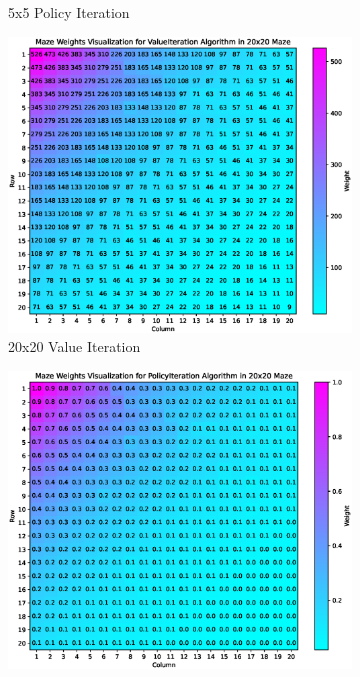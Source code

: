 \documentclass{article}
\begin{document}
\begin{figure}[hp]
\begin{subfigure}[b]{0.48\textwidth}
        \caption{5x5 Policy Iteration}
    \end{subfigure}
    \newline
    \begin{subfigure}[b]{0.48\textwidth}
        \centering
        \includegraphics[width=\textwidth]{imgs/ValueIteration-20-20.eps}
        \caption{20x20 Value Iteration}
    \end{subfigure}
    \begin{subfigure}[b]{0.48\textwidth}
        \centering
        \includegraphics[width=\textwidth]{imgs/PolicyIteration-20-20.eps}

\end{subfigure}
\end{figure}
\end{document}
